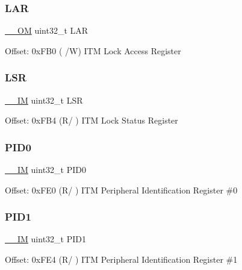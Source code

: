\subsubsection{\texorpdfstring{L\+AR}{LAR}}
{\footnotesize\ttfamily \mbox{\hyperlink{core__cm4_8h_a0ea2009ed8fd9ef35b48708280fdb758}{\+\_\+\+\_\+\+OM}} uint32\+\_\+t L\+AR}

Offset\+: 0x\+F\+B0 ( /W) I\+TM Lock Access Register \mbox{\label{struct_i_t_m___type_a7219432d03f6cd1d220f4fe10aef4880}} 
\subsubsection{\texorpdfstring{L\+SR}{LSR}}
{\footnotesize\ttfamily \mbox{\hyperlink{core__cm4_8h_a4cc1649793116d7c2d8afce7a4ffce43}{\+\_\+\+\_\+\+IM}} uint32\+\_\+t L\+SR}

Offset\+: 0x\+F\+B4 (R/ ) I\+TM Lock Status Register \mbox{\label{struct_i_t_m___type_a6e3343cc3c4a8a5a6f14937882e9202a}} 
\subsubsection{\texorpdfstring{P\+I\+D0}{PID0}}
{\footnotesize\ttfamily \mbox{\hyperlink{core__cm4_8h_a4cc1649793116d7c2d8afce7a4ffce43}{\+\_\+\+\_\+\+IM}} uint32\+\_\+t P\+I\+D0}

Offset\+: 0x\+F\+E0 (R/ ) I\+TM Peripheral Identification Register \#0 \mbox{\label{struct_i_t_m___type_afa06959344f4991b00e6c545dd2fa30b}} 
\subsubsection{\texorpdfstring{P\+I\+D1}{PID1}}
{\footnotesize\ttfamily \mbox{\hyperlink{core__cm4_8h_a4cc1649793116d7c2d8afce7a4ffce43}{\+\_\+\+\_\+\+IM}} uint32\+\_\+t P\+I\+D1}

Offset\+: 0x\+F\+E4 (R/ ) I\+TM Peripheral Identification Register \#1 \mbox{\label{struct_i_t_m___type_a63db39f871596d28e69c283288ea2eba}} 
